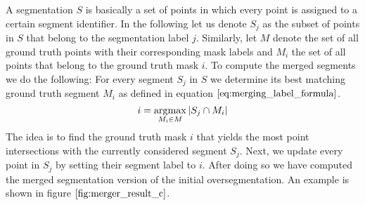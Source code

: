 A segmentation $S$ is basically a set of points in which every point is assigned to a certain segment identifier. In the following let us denote $S_j$ as the subset of points in $S$ that belong to the segmentation label $j$. Similarly, let $M$ denote the set of all ground truth points with their corresponding mask labels and $M_i$ the set of all points that belong to the ground truth mask $i$. To compute the merged segments we do the following: For every segment $S_j$ in $S$ we determine its best matching ground truth segment $M_i$ as defined in equation $\ref{eq:merging_label_formula}$. 
\begin{equation}
i = \operatorname*{\arg\!\max}\limits_{M_i \in M} \left\vert{S_j \cap M_i}\right\vert
\label{eq:merging_label_formula}
\end{equation}
The idea is to find the ground truth mask $i$ that yields the most point intersections with the currently considered segment $S_j$. Next, we update every point in $S_j$ by setting their segment label to $i$. After doing so we have computed the merged segmentation version of the initial oversegmentation. An example is shown in figure $\ref{fig:merger_result_c}$.

